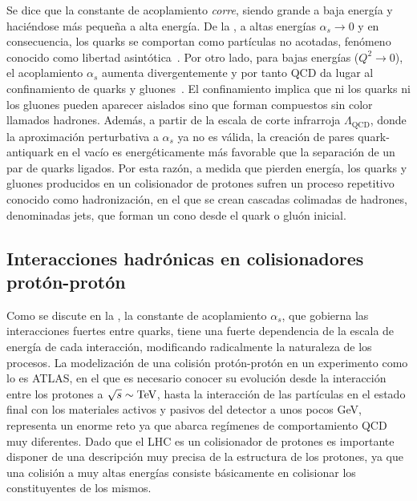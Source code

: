 Se dice que la constante de acoplamiento \textit{corre}, siendo grande a baja energía y haciéndose más pequeña a alta energía. De la \Eqn{\ref{eq:theory:sm:mathematical:qcd:alphas}}, a altas energías \(\alpha_s \to 0\) y en consecuencia, los quarks se comportan como partículas no acotadas, fenómeno conocido como libertad asintótica~\cite{Wilczek_Gross-1973,Politzer-1973}.
Por otro lado, para bajas energías (\(Q^2 \to 0\)), el acoplamiento \(\alpha_s\) aumenta divergentemente y por tanto \ac{QCD} da lugar al confinamiento de quarks y gluones~\cite{Glashow_Georgi-1974}. El confinamiento implica que ni los quarks ni los gluones pueden aparecer aislados sino que forman compuestos sin color llamados hadrones.
Además, a partir de la escala de corte infrarroja \(\Lambda_{\text{QCD}}\), donde la aproximación perturbativa a \(\alpha_s\) ya no es válida, la creación de pares quark-antiquark en el vacío es energéticamente más favorable que la separación de un par de quarks ligados. Por esta razón, a medida que pierden energía, los quarks y gluones producidos en un colisionador de protones sufren un proceso repetitivo conocido como hadronización, en el que se crean cascadas colimadas de hadrones, denominadas jets, que forman un cono desde el quark o gluón inicial.


\subsection{Interacciones hadrónicas en colisionadores protón-protón}
\label{subsec:theory:sm:hadron_interactions}

Como se discute en la \Sect{\ref{subsubsec:theory:sm:mathematical:qcd}}, la constante de acoplamiento \(\alpha_s\), que gobierna las interacciones fuertes entre quarks, tiene una fuerte dependencia de la escala de energía de cada interacción, modificando radicalmente la naturaleza de los procesos. La modelización de una colisión protón-protón en un experimento como lo es \ac{ATLAS}, en el que es necesario conocer su evolución desde la interacción entre los protones a \(\sqrt{s} \sim \text{TeV}\), hasta la interacción de las partículas en el estado final con los materiales activos y pasivos del detector a unos pocos GeV, representa un enorme reto ya que abarca regímenes de comportamiento \ac{QCD} muy diferentes. Dado que el \ac{LHC} es un colisionador de protones es importante disponer de una descripción muy precisa de la estructura de los protones, ya que una colisión \pp a muy altas energías consiste básicamente en colisionar los constituyentes de los mismos.

